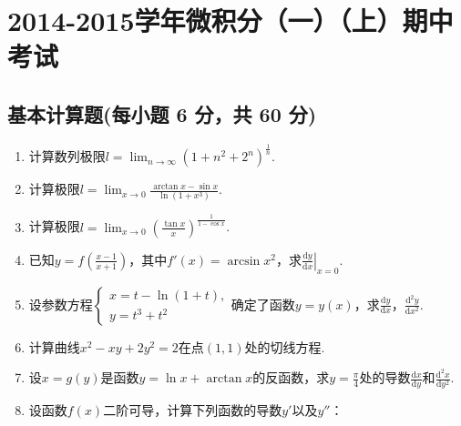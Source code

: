 \documentclass[../Main.tex]{subfiles}
\begin{document}
\chapter{2014-2015学年微积分（一）（上）期中考试}

\section{基本计算题(每小题 6 分，共 60 分)}
\begin{enumerate}
    \item 计算数列极限$l=\lim_{n\to\infty}\left(1+n^{2}+2^{n}\right)^{\frac{1}{n}}$.
          \vspace{11em}

    \item 计算极限$l=\lim_{x\to 0}\frac{\arctan x-\sin x}{\ln(1+x^{3})}$.
          \vspace{11em}

    \item 计算极限$l=\lim_{x\to 0}\left(\frac{\tan x}{x}\right)^{\frac{1}{1-\cos
                      x}}$.
          \vspace{11em}

    \item 已知$y=f\left(\frac{x-1}{x+1}\right)$，其中$f'(x)=\arcsin x^{2}$，求$\left
              .\frac{\mathrm{d}y}{\mathrm{d}x}\right|_{x=0}$.
          \vspace{9em}

    \item 设参数方程$\begin{cases}
                  x=t-\ln(1+t), \\
                  y=t^{3}+t^{2}
              \end{cases}$确定了函数$y=y(x)$，求$\frac{\mathrm{d}y}{\mathrm{d}x}$，$\frac{\mathrm{d}^{2}
                  y}{\mathrm{d}x^{2}}$.
          \vspace{9em}

    \item 计算曲线$x^{2}-xy+2y^{2}=2$在点$(1,1)$处的切线方程.
          \vspace{9em}

    \item 设$x=g(y)$是函数$y=\ln x+\arctan x$的反函数，求$y=\frac{\pi}{4}$处的导数$\frac{\mathrm{d}x}{\mathrm{d}y}$和$\frac{\mathrm{d}^{2}
                  x}{\mathrm{d}y^{2}}$.
          \vspace{9em}

    \item 设函数$f(x)$二阶可导，计算下列函数的导数$y'$以及$y''$：


\end{enumerate}
\end{document}
